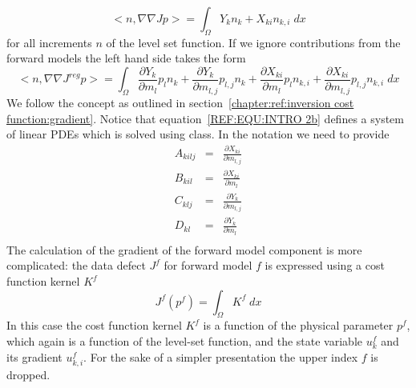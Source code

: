 \begin{equation}\label{REF:EQU:INTRO 2b}
<n,\nabla \nabla J p > = \int_{\Omega} Y_k n_k + X_{ki} n_{k,i} \; dx
\end{equation} 
for all increments $n$ of the level set function. If we ignore contributions 
from the forward models the left hand side takes the form
\begin{equation}\label{REF:EQU:INTRO 2c}
<n,\nabla \nabla J^{reg} p > = \int_{\Omega} 
\displaystyle{\frac{\partial Y_k}{\partial m_l}} p_l n_k +
\displaystyle{\frac{\partial Y_k}{\partial m_{l,j}}} p_{l,j} n_k +
\displaystyle{\frac{\partial X_{ki}}{\partial m_l}} p_l n_{k,i} +
\displaystyle{\frac{\partial X_{ki}}{\partial m_{l,j}}} p_{l,j} n_{k,i} 
\; dx
\end{equation}  We follow the concept as outlined in section~\ref{chapter:ref:inversion cost function:gradient}.
Notice that equation~\ref{REF:EQU:INTRO 2b} defines a system of linear PDEs
which is solved using \escript {} class. In the \escript notation we need to provide 
\begin{equation}\label{ref:EQU:REG:600}
\begin{array}{rcl}
 A_{kilj} & = &  \displaystyle{\frac{\partial X_{ki}}{\partial m_{l,j}}}  \\
 B_{kil} & = &  \displaystyle{\frac{\partial X_{ki}}{\partial m_l}}   \\
 C_{klj} & = &  \displaystyle{\frac{\partial Y_k}{\partial m_{l,j}}}    \\
  D_{kl} & = & \displaystyle{\frac{\partial Y_k}{\partial m_l}}    \\ 
\end{array}
\end{equation} 
The calculation of the gradient of the forward model component is more complicated:
the data defect $J^{f}$ for forward model $f$ is expressed using a cost function kernel $K^{f}$ 
\begin{equation}\label{REF:EQU:INTRO 2bb}
J^{f}(p^f) = \int_{\Omega} K^{f} \; dx
\end{equation} 
In this case the cost function kernel $K^{f}$ is a function of the 
physical parameter $p^f$, which again is a function of the level-set function,
and the state variable $u^f_{k}$ and its gradient $u^f_{k,i}$. For the sake of a simpler 
presentation the upper index $f$ is dropped.
 
